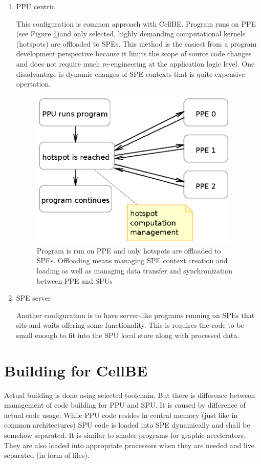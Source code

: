 \begin{enumerate}
\item PPU centric
\par
This configuration is common approach with CellBE. Program runs on PPE (see Figure \ref{fg:PPUCentricModel})and only selected, highly demanding computational kernels (hotspots) are offloaded to SPEs. This method is the easiest from a program development perspective because it limits the scope of source code changes and does not require much re-engineering at the application logic level. One disadvantage is dynamic changes of SPE contexts that is quite expensive opertation.

\begin{figure}
    \centering
    \includegraphics[width=10cm]{data/PPUCentricModel.eps}
    \caption[PPU centric configuration]{Program is run on PPE and only hotspots are offloaded to SPEs. Offloading means managing SPE context creation and loading as well as managing data transfer and synchronization between PPE and SPUs}
    \label{fg:PPUCentricModel}
\end{figure}

\item SPE server
\par
Another configuration is to have server-like programs running on SPEs that sits and waits offering some functionality. This is requires the code to be small enough to fit into the SPU local store along with processed data.

\end{enumerate}

\section {Building for CellBE}
\par
Actual building is done using selected toolchain. But there is difference
between management of code building for PPU and SPU. It is caused by difference
of actual code usage. While PPU code resides in central memory (just like in
common architectures) SPU code is loaded into SPE dynamically and shall be
somehow separated. It is similar to shader programs for graphic accelerators.
They are also loaded into appropriate processors when they are needed and live
separated (in form of files).

